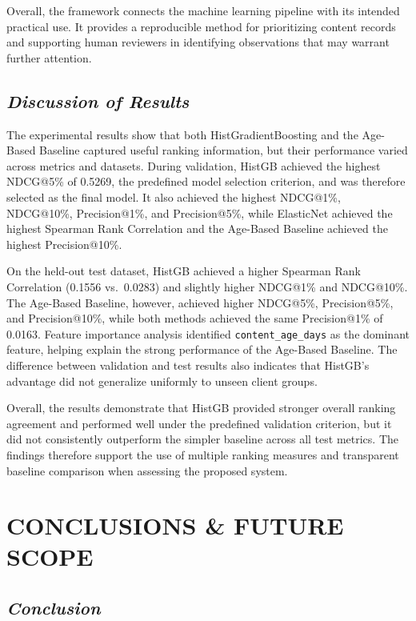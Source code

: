 \documentclass[12pt,a4paper]{report}
\begin{document}
Overall, the framework connects the machine learning pipeline with its intended practical use. It provides a reproducible method for prioritizing content records and supporting human reviewers in identifying observations that may warrant further attention.

\section{\textit{Discussion of Results}}
The experimental results show that both HistGradientBoosting and the Age-Based Baseline captured useful ranking information, but their performance varied across metrics and datasets. During validation, HistGB achieved the highest NDCG@5\% of 0.5269, the predefined model selection criterion, and was therefore selected as the final model. It also achieved the highest NDCG@1\%, NDCG@10\%, Precision@1\%, and Precision@5\%, while ElasticNet achieved the highest Spearman Rank Correlation and the Age-Based Baseline achieved the highest Precision@10\%.

On the held-out test dataset, HistGB achieved a higher Spearman Rank Correlation (0.1556 vs.\ 0.0283) and slightly higher NDCG@1\% and NDCG@10\%. The Age-Based Baseline, however, achieved higher NDCG@5\%, Precision@5\%, and Precision@10\%, while both methods achieved the same Precision@1\% of 0.0163. Feature importance analysis identified \texttt{content\_age\_days} as the dominant feature, helping explain the strong performance of the Age-Based Baseline. The difference between validation and test results also indicates that HistGB's advantage did not generalize uniformly to unseen client groups.

Overall, the results demonstrate that HistGB provided stronger overall ranking agreement and performed well under the predefined validation criterion, but it did not consistently outperform the simpler baseline across all test metrics. The findings therefore support the use of multiple ranking measures and transparent baseline comparison when assessing the proposed system.

\chapter{CONCLUSIONS \& FUTURE SCOPE}

\section{\textit{Conclusion}}
\end{document}
